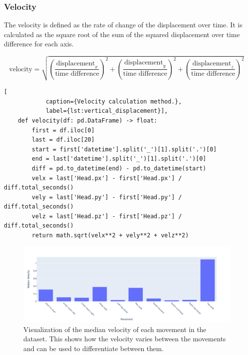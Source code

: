             \subsubsection{Velocity}
                
                The velocity is defined as the rate of change of the displacement over time. It is calculated as the square root of the sum of the squared displacement over time difference for each axis. 

                \begin{equation}\label{eq:velocity}
                    \text{velocity} = \sqrt{\left(\frac{\text{displacement}_x}{\text{time difference}}\right)^2 + \left(\frac{\text{displacement}_y}{\text{time difference}}\right)^2 + \left(\frac{\text{displacement}_z}{\text{time difference}}\right)^2}
                \end{equation}

                               
        \begin{lstlisting}[
            caption={Velocity calculation method.}, 
            label={lst:vertical_displacement}],     
    def velocity(df: pd.DataFrame) -> float:
        first = df.iloc[0]
        last = df.iloc[20]
        start = first['datetime'].split('_')[1].split('.')[0]
        end = last['datetime'].split('_')[1].split('.')[0]
        diff = pd.to_datetime(end) - pd.to_datetime(start)
        velx = last['Head.px'] - first['Head.px'] / diff.total_seconds()
        vely = last['Head.py'] - first['Head.py'] / diff.total_seconds()
        velz = last['Head.pz'] - first['Head.pz'] / diff.total_seconds()
        return math.sqrt(velx**2 + vely**2 + velz**2)
        \end{lstlisting}

                \begin{figure}[H]
                    \centering
                    \includegraphics[width=1.0\textwidth]{../src/resources/velocity.png}
                    \caption{
                       Visualization of the median velocity of each movement in the dataset. This shows how the velocity varies between the movements and can be used to differentiate between them.
                    }
                    \label{fig:velocity}
                \end{figure}

